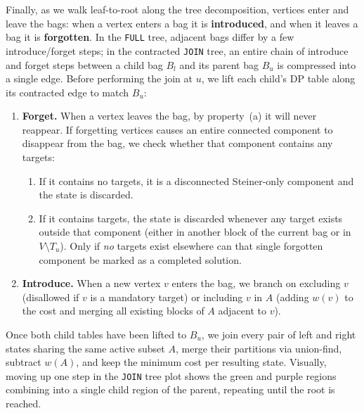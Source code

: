 \documentclass[11pt]{article}
\theoremstyle{definition}
\theoremstyle{remark}
\begin{document}
Finally, as we walk leaf-to-root along the tree decomposition, vertices enter and leave the bags: when a vertex enters a bag it is \textbf{introduced}, and when it leaves a bag it is \textbf{forgotten}. In the \texttt{FULL} tree, adjacent bags differ by a few introduce/forget steps; in the contracted \texttt{JOIN} tree, an entire chain of introduce and forget steps between a child bag $B_l$ and its parent bag $B_u$ is compressed into a single edge. Before performing the join at $u$, we lift each child's DP table along its contracted edge to match $B_u$:
\begin{enumerate}
    \item[$\bullet$] \textbf{Forget.} When a vertex leaves the bag, by property~(a) it will never reappear. If forgetting vertices causes an entire connected component to disappear from the bag, we check whether that component contains any targets:
    \begin{enumerate}
        \item If it contains no targets, it is a disconnected Steiner-only component and the state is discarded.
        \item If it contains targets, the state is discarded whenever any target exists outside that component (either in another block of the current bag or in $V \setminus T_u$). Only if \emph{no} targets exist elsewhere can that single forgotten component be marked as a completed solution.
    \end{enumerate}
    \item[$\bullet$] \textbf{Introduce.} When a new vertex $v$ enters the bag, we branch on excluding $v$ (disallowed if $v$ is a mandatory target) or including $v$ in $A$ (adding $w(v)$ to the cost and merging all existing blocks of $A$ adjacent to $v$).
\end{enumerate}
Once both child tables have been lifted to $B_u$, we join every pair of left and right states sharing the same active subset $A$, merge their partitions via union-find, subtract $w(A)$, and keep the minimum cost per resulting state. Visually, moving up one step in the \texttt{JOIN} tree plot shows the green and purple regions combining into a single child region of the parent, repeating until the root is reached.
\end{document}
